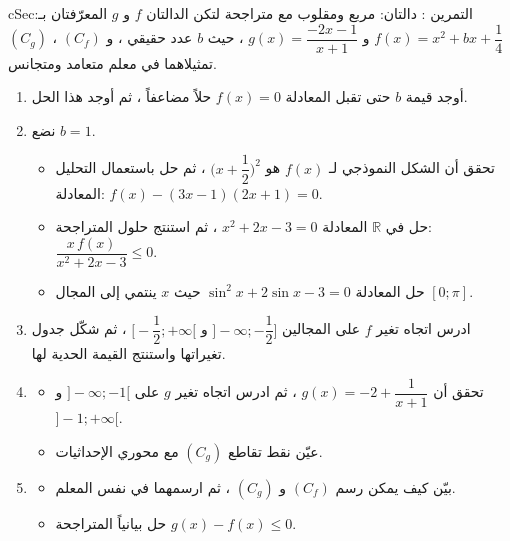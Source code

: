\documentclass[12pt,a4paper]{article}
\newenvironment{BOX}[2]{\begin{otherlanguage}{english}\begin{arbox}{#1}{#2}}{\end{arbox}\end{otherlanguage}}
\newcounter{exo}
\newenvironment{tamrin}[1]{\stepcounter{exo}\begin{BOX}{cSec}{التمرين \theexo: #1}}{\end{BOX}}
\newcommand{\R}{\mathbb{R}}
\newenvironment{sq}{\begin{itemize}[leftmargin=2.4em,itemsep=3pt]}{\end{itemize}}
\newcommand{\qa}{\item[(أ)]}\newcommand{\qb}{\item[(ب)]}\newcommand{\qc}{\item[(جـ)]}\newcommand{\qd}{\item[(د)]}\newcommand{\qe}{\item[(هـ)]}
\begin{document}
\begin{tamrin}{دالتان: مربع ومقلوب مع متراجحة}
لتكن الدالتان $f$ و $g$ المعرّفتان بـ: $f(x)=x^2+bx+\dfrac14$ و $g(x)=\dfrac{-2x-1}{x+1}$ ، حيث $b$ عدد حقيقي ، و $(C_f)$ ، $(C_g)$ تمثيلاهما في معلم متعامد ومتجانس.
\begin{enumerate}
\item أوجد قيمة $b$ حتى تقبل المعادلة $f(x)=0$ حلاً مضاعفاً ، ثم أوجد هذا الحل.
\item نضع $b=1$.
\begin{sq}
\qa تحقق أن الشكل النموذجي لـ $f(x)$ هو $\Big(x+\dfrac12\Big)^2$ ، ثم حل باستعمال التحليل المعادلة: $f(x)-(3x-1)(2x+1)=0$.
\qb حل في $\R$ المعادلة $x^2+2x-3=0$ ، ثم استنتج حلول المتراجحة: $\dfrac{x\,f(x)}{x^2+2x-3}\le0$.
\qc حل المعادلة $\sin^2x+2\sin x-3=0$ حيث $x$ ينتمي إلى المجال $[0;\pi]$.
\end{sq}
\item ادرس اتجاه تغير $f$ على المجالين $\Big]-\infty;-\dfrac12\Big]$ و $\Big[-\dfrac12;+\infty\Big[$ ، ثم شكّل جدول تغيراتها واستنتج القيمة الحدية لها.
\item
\begin{sq}
\qa تحقق أن $g(x)=-2+\dfrac1{x+1}$ ، ثم ادرس اتجاه تغير $g$ على $]-\infty;-1[$ و $]-1;+\infty[$.
\qb عيّن نقط تقاطع $(C_g)$ مع محوري الإحداثيات.
\end{sq}
\item
\begin{sq}
\qa بيّن كيف يمكن رسم $(C_f)$ و $(C_g)$ ، ثم ارسمهما في نفس المعلم.
\qb حل بيانياً المتراجحة $g(x)-f(x)\le0$.
\end{sq}
\end{enumerate}
\end{tamrin}
\end{document}
